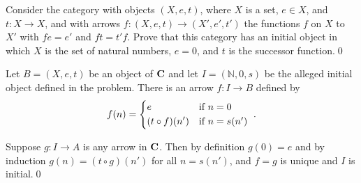\begin{problem}
  Consider the category with objects \((X, e, t)\), where \(X\) is a set, \(e
  \in X\), and \(t : X \to X\), and with arrows \(f: (X, e, t) \to (X', e',
  t')\) the functions \(f\) on \(X\) to \(X'\) with \(fe = e'\) and \(ft = t'
  f\). Prove that this category has an initial object in which \(X\) is the set
  of natural numbers, \(e = 0\), and \(t\) is the successor function.\qed{}
  \begin{Solution}
    Let \(B = (X, e, t)\) be an object of \(\mathbf{{C}}\) and let \(I = (\mathbb{N}, 0,
    s)\) be the alleged initial object defined in the problem. There is an arrow
    \(f: I \to B\) defined by 
    \[f(n) = \begin{dcases*}
      e & if \(n = 0\)\\
      (t\circ f)(n') & if \(n = s(n')\)
    \end{dcases*}.\]

    Suppose \(g: I \to A\) is any arrow in \(\mathbf{{C}}\). Then by definition \(g(0) =
    e\) and by induction \(g(n) = (t\circ g)(n')\) for all \(n = s(n')\), and
    \(f = g\) is unique and \(I\) is initial.\qed{}
  \end{Solution}
\end{problem}

